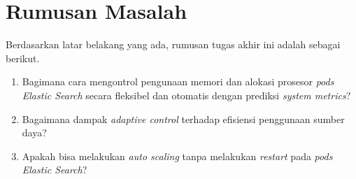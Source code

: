 \section{Rumusan Masalah}

Berdasarkan latar belakang yang ada, rumusan tugas akhir ini adalah sebagai berikut.
\begin{enumerate}
    \item Bagimana cara mengontrol pengunaan memori dan alokasi prosesor \textit{pods Elastic Search} secara fleksibel dan otomatis dengan prediksi \textit{system metrics}?
    \item Bagaimana dampak \textit{adaptive control} terhadap efisiensi penggunaan sumber daya?
    \item Apakah bisa melakukan \textit{auto scaling} tanpa melakukan \textit{restart} pada \textit{pods Elastic Search}?
\end{enumerate}